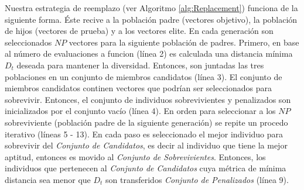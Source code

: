 Nuestra estrategia de reemplazo (ver Algoritmo \ref{alg:Replacement}) funciona de la siguiente forma.
%
Éste recive a la población padre (vectores objetivo), la población de hijos (vectores de prueba) y a los vectores elite.
%
En cada generación son seleccionados $NP$ vectores para la siguiente población de padres.
%
Primero, en base al número de evaluaciones a funcion (línea 2) es calculada una distancia mínima $D_t$ deseada para mantener la diversidad.
%
Entonces, son juntadas las tres poblaciones en un conjunto de miembros candidatos (línea 3).
%
El conjunto de miembros candidatos continen vectores que podrían ser seleccionados para sobrevivir.
%
Entonces, el conjunto de individuos sobrevivientes y penalizados son inicializados por el conjunto vacío (línea 4).
%
En orden para seleccionar a los $NP$ sobreviviente (población padre de la siguiente generación) se repite un procedo iterativo (líneas 5 - 13).
%
En cada paso es seleccionado el mejor individuo para sobrevivir del \textit{Conjunto de Candidatos}, es decir al individuo que tiene la mejor aptitud, entonces es movido al \textit{Conjunto de Sobrevivientes}.
%
Entonces, los individuos que pertenecen al \textit{Conjunto de Candidatos} cuya métrica de mínima distancia sea menor que $D_t$ son transferidos \textit{Conjunto de Penalizados} (línea 9).
%

